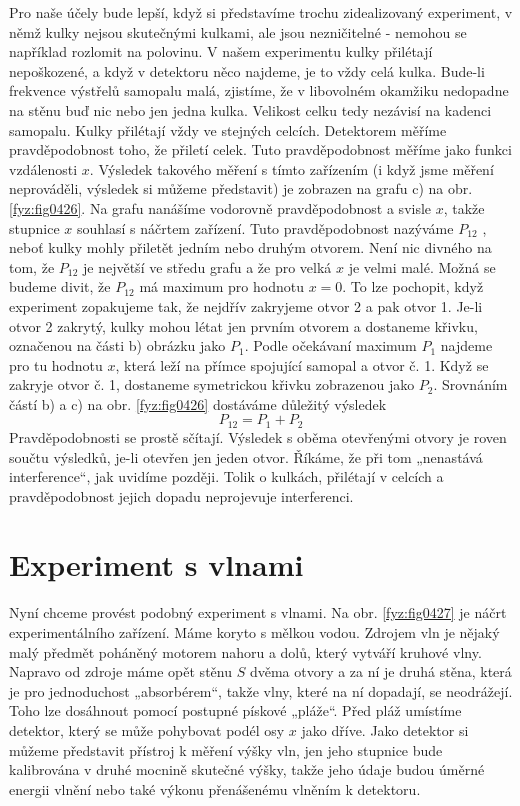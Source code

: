     Pro naše účely bude lepší, když si představíme trochu zidealizovaný experiment, v němž kulky
    nejsou skutečnými kulkami, ale jsou nezničitelné - nemohou se například rozlomit na polovinu. V
    našem experimentu kulky přilétají nepoškozené, a když v detektoru něco najdeme, je to vždy celá
    kulka. Bude-li frekvence výstřelů samopalu malá, zjistíme, že v libovolném okamžiku nedopadne na
    stěnu buď nic nebo jen jedna kulka. Velikost celku tedy nezávisí na kadenci samopalu. Kulky
    přilétají vždy ve stejných celcích. Detektorem měříme pravděpodobnost toho, že přiletí celek.
    Tuto pravděpodobnost měříme jako funkci vzdálenosti \(x\). Výsledek takového měření s tímto
    zařízením (i když jsme měření neprováděli, výsledek si můžeme představit) je zobrazen na grafu
    c) na obr. \ref{fyz:fig0426}. Na grafu nanášíme vodorovně pravděpodobnost a svisle \(x\), takže
    stupnice \(x\) souhlasí s náčrtem zařízení. Tuto pravděpodobnost nazýváme \(P_{12}\) , neboť
    kulky mohly přiletět jedním nebo druhým otvorem. Není nic divného na tom, že \(P_{12}\) je
    největší ve středu grafu a že pro velká \(x\) je velmi malé. Možná se budeme divit, že
    \(P_{12}\) má maximum pro hodnotu \(x= 0\). To lze pochopit, když experiment zopakujeme tak, že
    nejdřív zakryjeme otvor 2 a pak otvor 1. Je-li otvor 2 zakrytý, kulky mohou létat jen prvním
    otvorem a dostaneme křivku, označenou na části b) obrázku jako \(P_1\). Podle očekávaní maximum
    \(P_1\) najdeme pro tu hodnotu \(x\), která leží na přímce spojující samopal a otvor č. 1. Když
    se zakryje otvor č. 1, dostaneme symetrickou křivku zobrazenou jako \(P_2\). Srovnáním částí b)
    a c) na obr. \ref{fyz:fig0426} dostáváme důležitý výsledek
    \begin{equation}\label{fyz:eq591}
      P_{12} = P_1 + P_2
    \end{equation}
    Pravděpodobnosti se prostě sčítají. Výsledek s oběma otevřenými otvory je roven součtu výsledků,
    je-li otevřen jen jeden otvor. Říkáme, že při tom „nenastává interference“, jak uvidíme později.
    Tolik o kulkách, přilétají v celcích a pravděpodobnost jejich dopadu neprojevuje interferenci.
  
  \section{Experiment s vlnami}\label{fyz:IchapXXXVIIsecIII}
    Nyní chceme provést podobný experiment s vlnami. Na obr. \ref{fyz:fig0427} je náčrt
    experimentálního zařízení. Máme koryto s mělkou vodou. Zdrojem vln je nějaký malý předmět poháněný
    motorem nahoru a dolů, který vytváří kruhové vlny. Napravo od zdroje máme opět stěnu \(S\) dvěma
    otvory a za ní je druhá stěna, která je pro jednoduchost „absorbérem“, takže vlny, které na ní
    dopadají, se neodrážejí. Toho lze dosáhnout pomocí postupné pískové „pláže“. Před pláž umístíme
    detektor, který se může pohybovat podél osy \(x\) jako dříve. Jako detektor si můžeme představit
    přístroj k měření výšky vln, jen jeho stupnice bude kalibrována v druhé mocnině skutečné výšky,
    takže jeho údaje budou úměrné energii vlnění nebo také výkonu přenášenému vlněním k detektoru.

